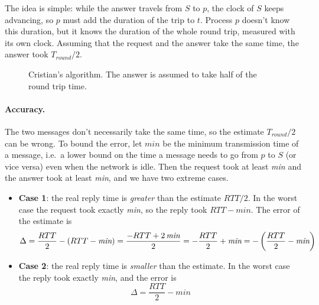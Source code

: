 The idea is simple: while the answer travels from $S$ to $p$, the clock of $S$ keeps advancing, so $p$ must add the duration of the trip to $t$. Process $p$ doesn't know this duration, but it knows the duration of the whole round trip, measured with its own clock. Assuming that the request and the answer take the same time, the answer took $T_{round}/2$.

\begin{figure}[H]
  \centering
  \caption{Cristian's algorithm. The answer is assumed to take half of the round trip time.}
  \label{fig:cristian}
\end{figure}

\paragraph{Accuracy.} The two messages don't necessarily take the same time, so the estimate $T_{round}/2$ can be wrong. To bound the error, let $\textit{min}$ be the minimum transmission time of a message, i.e.\ a lower bound on the time a message needs to go from $p$ to $S$ (or vice versa) even when the network is idle. Then the request took at least \textit{min} and the answer took at least \textit{min}, and we have two extreme cases.
\begin{itemize}
  \item \textbf{Case 1}: the real reply time is \textit{greater} than the estimate $RTT/2$. In the worst case the request took exactly \textit{min}, so the reply took $RTT - \textit{min}$. The error of the estimate is
  \[\Delta = \frac{RTT}{2} - (RTT - \textit{min}) = \frac{-RTT + 2\,\textit{min}}{2} = -\frac{RTT}{2} + \textit{min} = -\left( \frac{RTT}{2} - \textit{min} \right)\]
  \item \textbf{Case 2}: the real reply time is \textit{smaller} than the estimate. In the worst case the reply took exactly \textit{min}, and the error is
  \[\Delta = \frac{RTT}{2} - \textit{min}\]
\end{itemize}

